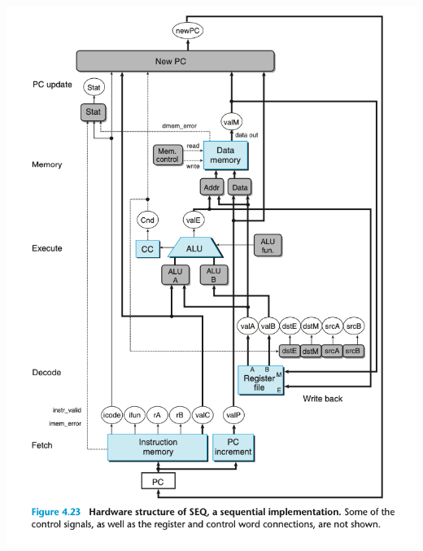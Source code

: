 \documentclass[11pt]{article}
\begin{document}
\begin{center}
\includegraphics[width=.9\linewidth]{pics/figure4.23-hardware-structure-of-seq-a-sequential-implementation.png}
\end{center}
\end{document}
